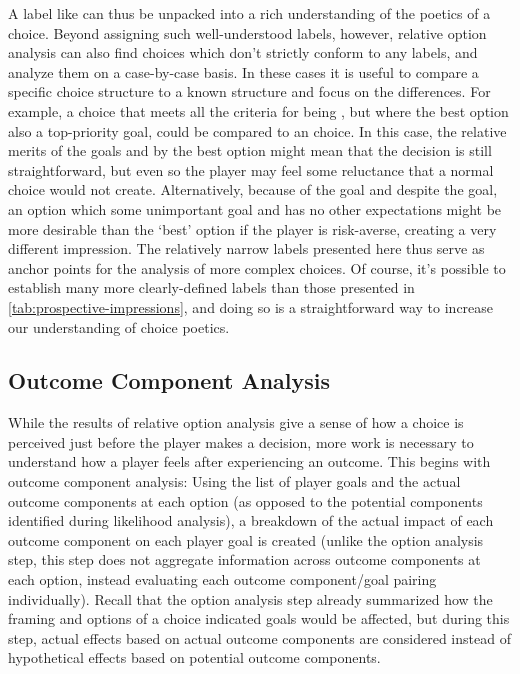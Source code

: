 A label like  can thus be unpacked into a rich understanding of the poetics of a choice.
%
Beyond assigning such well-understood labels, however, relative option analysis can also find choices which don't strictly conform to any labels, and analyze them on a case-by-case basis.
%
In these cases it is useful to compare a specific choice structure to a known structure and focus on the differences.
%
For example, a choice that meets all the criteria for being , but where the best option also  a top-priority goal, could be compared to an  choice.
%
In this case, the relative merits of the goals  and  by the best option might mean that the decision is still straightforward, but even so the player may feel some reluctance that a normal  choice would not create.
%
Alternatively, because of the  goal and despite the  goal, an option which  some unimportant goal and has no other expectations might be more desirable than the `best' option if the player is risk-averse, creating a very different impression.
%
The relatively narrow labels presented here thus serve as anchor points for the analysis of more complex choices.
%
Of course, it's possible to establish many more clearly-defined labels than those presented in \cref{tab:prospective-impressions}, and doing so is a straightforward way to increase our understanding of choice poetics.


\subsection{Outcome Component Analysis}

\label{sec:cp-outcome-component-analysis}

While the results of relative option analysis give a sense of how a choice is perceived just before the player makes a decision, more work is necessary to understand how a player feels after experiencing an outcome.
%
This begins with outcome component analysis: Using the list of player goals and the actual outcome components at each option (as opposed to the potential components identified during likelihood analysis), a breakdown of the actual impact of each outcome component on each player goal is created (unlike the option analysis step, this step does not aggregate information across outcome components at each option, instead evaluating each outcome component/goal pairing individually).
%
Recall that the option analysis step already summarized how the framing and options of a choice indicated goals would be affected, but during this step, actual effects based on actual outcome components are considered instead of hypothetical effects based on potential outcome components.


